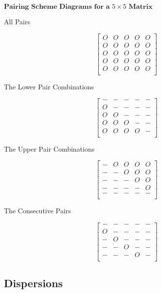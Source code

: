 \newpage

\begin{center}
$\textbf{Pairing Scheme Diagrams for a $5 \times 5$ Matrix}$
\end{center}

All Pairs

$$
\begin{bmatrix}
O & O & O & O & O\\
O & O & O & O & O\\
O & O & O & O & O\\
O & O & O & O & O\\
O & O & O & O & O\\
\end{bmatrix}
$$

The Lower Pair Combinations

$$
\begin{bmatrix}
- & - & - & - & -\\
O & - & - & - & -\\
O & O & - & - & -\\
O & O & O & - & -\\
O & O & O & O & -\\
\end{bmatrix}
$$

The Upper Pair Combinations

$$
\begin{bmatrix}
- & O & O & O & O\\
- & - & O & O & O\\
- & - & - & O & O\\
- & - & - & - & O\\
- & - & - & - & -\\
\end{bmatrix}
$$

The Consecutive Pairs 

$$
\begin{bmatrix}
- & - & - & - & -\\
O & - & - & - & -\\
- & O & - & - & -\\
- & - & O & - & -\\
- & - & - & O & -\\
\end{bmatrix}
$$

\newpage


\subsection{Dispersions}


